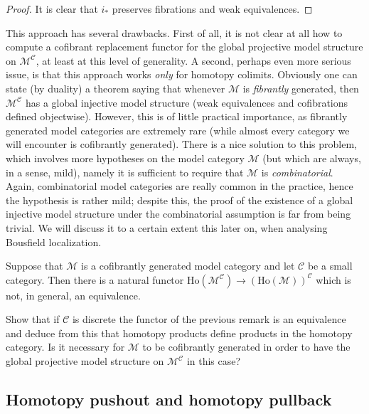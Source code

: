 \begin{refsection}
\begin{proof}
It is clear that $i_*$ preserves fibrations and weak equivalences.
\end{proof}

\begin{rmk}
This approach has several drawbacks. First of all, it is not clear at all how to compute a cofibrant replacement functor for the global projective model structure on $\mathcal M^{\mathcal C}$, at least at this level of generality. A second, perhaps even more serious issue, is that this approach works \emph{only} for homotopy colimits. Obviously one can state (by duality) a theorem saying that whenever $\mathcal M$ is \emph{fibrantly} generated, then $\mathcal M^{\mathcal C}$ has a global injective model structure (weak equivalences and cofibrations defined objectwise). However, this is of little practical importance, as fibrantly generated model categories are extremely rare (while almost every category we will encounter is cofibrantly generated). There is a nice solution to this problem, which involves more hypotheses on the model category $\mathcal M$ (but which are always, in a sense, mild), namely it is sufficient to require that $\mathcal M$ is \emph{combinatorial}. Again, combinatorial model categories are really common in the practice, hence the hypothesis is rather mild; despite this, the proof of the existence of a global injective model structure under the combinatorial assumption is far from being trivial. We will discuss it to a certain extent this later on, when analysing Bousfield localization.
\end{rmk}

\begin{rmk}
Suppose that $\mathcal M$ is a cofibrantly generated model category and let $\mathcal C$ be a small category. Then there is a natural functor $\mathrm{Ho}(\mathcal M^{\mathcal C}) \to (\mathrm{Ho}(\mathcal M))^{\mathcal C}$ which is not, in general, an equivalence.
\end{rmk}

\begin{exercise}
Show that if $\mathcal C$ is discrete the functor of the previous remark is an equivalence and deduce from this that homotopy products define products in the homotopy category. Is it necessary for $\mathcal M$ to be cofibrantly generated in order to have the global projective model structure on $\mathcal M^{\mathcal C}$ in this case?
\end{exercise}

\subsection{Homotopy pushout and homotopy pullback}


\end{refsection}
